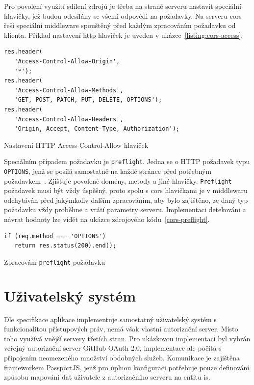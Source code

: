Pro povolení využití sdílení zdrojů je třeba na straně serveru nastavit speciální hlavičky, jež budou odesílány se všemi odpovědi na požadavky. Na serveru \gls{cors} řeší speciální middleware spouštěný před každým zpracováním požadavku od klienta. Příklad nastavení \gls{http} hlaviček je uveden v ukázce~\ref{listing:cors-access}.


\begin{fig:code}
	\begin{verbatim}
res.header(
   'Access-Control-Allow-Origin', 
   '*');
res.header(
   'Access-Control-Allow-Methods', 
   'GET, POST, PATCH, PUT, DELETE, OPTIONS');
res.header(
   'Access-Control-Allow-Headers', 
   'Origin, Accept, Content-Type, Authorization');
   \end{verbatim}
   \caption{Nastavení HTTP Access-Control-Allow hlaviček}\label{listing:cors-access}
\end{fig:code}


Speciálním případem požadavku je \texttt{preflight}. Jedna se o HTTP požadavek typu \texttt{OPTIONS}, jenž se posílá samostatně na každé stránce před potřebným požadavkem~\cite{corsActions}. Zjišťuje povolené domény, metody a jiné hlavičky. \texttt{Preflight} požadavek musí být vždy úspěšný, proto spolu s \gls{cors} hlavičkami je v middlewaru odchytáván před jakýmkoliv dalším zpracováním, aby  bylo zajištěno, ze daný typ požadavku vždy proběhne a vrátí parametry serveru. Implementaci detekování a návrat hodnoty lze vidět na ukázce zdrojového kódu~\ref{cors-preflight}.


\begin{fig:code}
   \begin{verbatim}   
if (req.method === 'OPTIONS')
   return res.status(200).end();
   \end{verbatim}
   \caption{Zpracování \texttt{preflight} požadavku}\label{cors-preflight}
\end{fig:code}





\section{Uživatelský systém}

Dle specifikace aplikace implementuje samostatný uživatelský systém s funkcionalitou přístupových práv, nemá však vlastní autorizační server. Místo toho využívá vnější servery třetích stran. Pro ukázkovou implementaci byl vybrán veřejný autorizační server GitHub OAuth 2.0, implementace ale počítá s připojením neomezeného množství obdobných služeb. Komunikace je zajištěna frameworkem PassportJS, jenž pro úplnou konfiguraci potřebuje pouze definování způsobu mapování dat uživatele z autorizačního serveru na entitu \gls{is}. 

